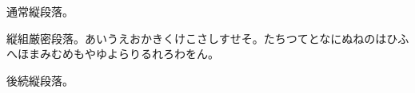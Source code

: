 \documentclass[pdflatex,tate]{jlreq}
\begin{document}
通常縦段落。
\begin{jlreqparagraph}
縦組厳密段落。あいうえおかきくけこさしすせそ。たちつてとなにぬねのはひふへほまみむめもやゆよらりるれろわをん。
\end{jlreqparagraph}
後続縦段落。
\makeatletter
{}
\makeatother
\end{document}
